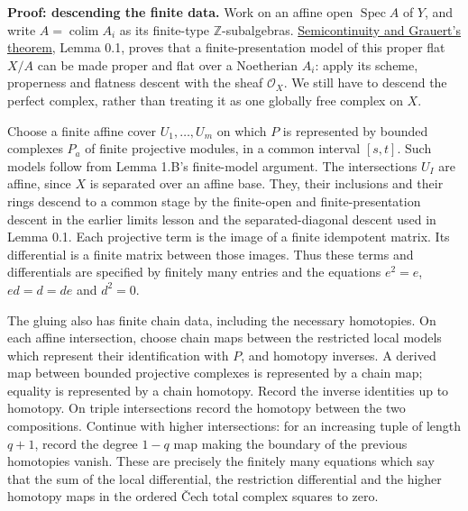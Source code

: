 \documentclass[11pt]{article}
\begin{document}
\textbf{Proof: descending the finite data.} Work on an affine open
\(\operatorname{Spec}A\) of \(Y\), and write
\(A=\operatorname{colim}A_i\) as its finite-type
\(\mathbb Z\)-subalgebras.
\href{semicontinuity-and-grauerts-theorem.md}{Semicontinuity and
Grauert's theorem}, Lemma 0.1, proves that a finite-presentation model
of this proper flat \(X/A\) can be made proper and flat over a
Noetherian \(A_i\): apply its scheme, properness and flatness descent
with the sheaf \(\mathcal O_X\). We still have to descend the perfect
complex, rather than treating it as one globally free complex on \(X\).

Choose a finite affine cover \(U_1,\ldots,U_m\) on which \(P\) is
represented by bounded complexes \(P_a\) of finite projective modules,
in a common interval \([s,t]\). Such models follow from Lemma 1.B's
finite-model argument. The intersections \(U_I\) are affine, since \(X\)
is separated over an affine base. They, their inclusions and their rings
descend to a common stage by the finite-open and finite-presentation
descent in the earlier limits lesson and the separated-diagonal descent
used in Lemma 0.1. Each projective term is the image of a finite
idempotent matrix. Its differential is a finite matrix between those
images. Thus these terms and differentials are specified by finitely
many entries and the equations \(e^2=e\), \(ed=d=de\) and \(d^2=0\).

The gluing also has finite chain data, including the necessary
homotopies. On each affine intersection, choose chain maps between the
restricted local models which represent their identification with \(P\),
and homotopy inverses. A derived map between bounded projective
complexes is represented by a chain map; equality is represented by a
chain homotopy. Record the inverse identities up to homotopy. On triple
intersections record the homotopy between the two compositions. Continue
with higher intersections: for an increasing tuple of length \(q+1\),
record the degree \(1-q\) map making the boundary of the previous
homotopies vanish. These are precisely the finitely many equations which
say that the sum of the local differential, the restriction differential
and the higher homotopy maps in the ordered Čech total complex squares
to zero.
\end{document}
